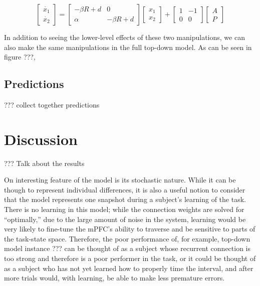 \documentclass[12pt]{article}
\begin{document}
\begin{equation*}
  \begin{bmatrix}
    \dot{x_1} \\ \dot{x_2}
  \end{bmatrix} = \begin{bmatrix}
    -\beta R + d & 0 \\ \alpha & -\beta R + d
  \end{bmatrix} \begin{bmatrix}
    x_1 \\ x_2
  \end{bmatrix} + \begin{bmatrix}
    1 & -1 \\ 0 & 0
  \end{bmatrix} \begin{bmatrix}
    A \\ P
  \end{bmatrix} 
\end{equation*}

In addition to seeing the lower-level effects
of these two manipulations,
we can also make the same manipulations in the full
top-down model. As can be seen in figure ???, %

\subsection{Predictions}

??? collect together predictions

\section{Discussion}

??? Talk about the results

On interesting feature of the model is its stochastic nature.
While it can be though to represent individual differences,
it is also a useful notion to consider that the model
represents one snapshot during a subject's
learning of the task.
There is no learning in this model;
while the connection weights are solved for ``optimally,''
due to the large amount of noise in the system,
learning would be very likely to fine-tune
the mPFC's ability to traverse and
be sensitive to parts of the task-state space.
Therefore, the poor performance of, for example,
top-down model instance ??? can be thought of as
a subject whose recurrent connection is too strong
and therefore is a poor performer in the task,
or it could be thought of as a subject
who has not yet learned how to properly time
the interval, and after more trials would,
with learning, be able to make less premature errors.
\end{document}
